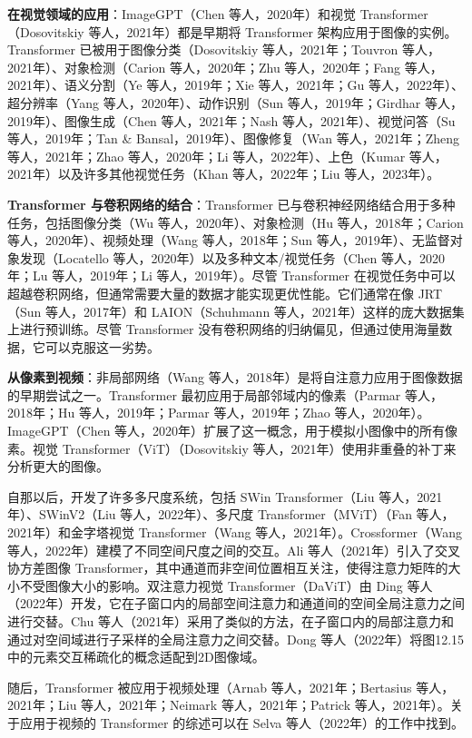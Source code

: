\textbf{在视觉领域的应用}：ImageGPT（Chen 等人，2020年）和视觉 Transformer（Dosovitskiy 等人，2021年）都是早期将 Transformer 架构应用于图像的实例。Transformer 已被用于图像分类（Dosovitskiy 等人，2021年；Touvron 等人，2021年）、对象检测（Carion 等人，2020年；Zhu 等人，2020年；Fang 等人，2021年）、语义分割（Ye 等人，2019年；Xie 等人，2021年；Gu 等人，2022年）、超分辨率（Yang 等人，2020年）、动作识别（Sun 等人，2019年；Girdhar 等人，2019年）、图像生成（Chen 等人，2021年；Nash 等人，2021年）、视觉问答（Su 等人，2019年；Tan \& Bansal，2019年）、图像修复（Wan 等人，2021年；Zheng 等人，2021年；Zhao 等人，2020年；Li 等人，2022年）、上色（Kumar 等人，2021年）以及许多其他视觉任务（Khan 等人，2022年；Liu 等人，2023年）。

\textbf{Transformer 与卷积网络的结合}：Transformer 已与卷积神经网络结合用于多种任务，包括图像分类（Wu 等人，2020年）、对象检测（Hu 等人，2018年；Carion 等人，2020年）、视频处理（Wang 等人，2018年；Sun 等人，2019年）、无监督对象发现（Locatello 等人，2020年）以及多种文本/视觉任务（Chen 等人，2020年；Lu 等人，2019年；Li 等人，2019年）。尽管 Transformer 在视觉任务中可以超越卷积网络，但通常需要大量的数据才能实现更优性能。它们通常在像 JRT（Sun 等人，2017年）和 LAION（Schuhmann 等人，2021年）这样的庞大数据集上进行预训练。尽管 Transformer 没有卷积网络的归纳偏见，但通过使用海量数据，它可以克服这一劣势。

\textbf{从像素到视频}：非局部网络（Wang 等人，2018年）是将自注意力应用于图像数据的早期尝试之一。Transformer 最初应用于局部邻域内的像素（Parmar 等人，2018年；Hu 等人，2019年；Parmar 等人，2019年；Zhao 等人，2020年）。ImageGPT（Chen 等人，2020年）扩展了这一概念，用于模拟小图像中的所有像素。视觉 Transformer（ViT）（Dosovitskiy 等人，2021年）使用非重叠的补丁来分析更大的图像。

自那以后，开发了许多多尺度系统，包括 SWin Transformer（Liu 等人，2021年）、SWinV2（Liu 等人，2022年）、多尺度 Transformer（MViT）（Fan 等人，2021年）和金字塔视觉 Transformer（Wang 等人，2021年）。Crossformer（Wang 等人，2022年）建模了不同空间尺度之间的交互。Ali 等人（2021年）引入了交叉协方差图像 Transformer，其中通道而非空间位置相互关注，使得注意力矩阵的大小不受图像大小的影响。双注意力视觉 Transformer（DaViT）由 Ding 等人（2022年）开发，它在子窗口内的局部空间注意力和通道间的空间全局注意力之间进行交替。Chu 等人（2021年）采用了类似的方法，在子窗口内的局部注意力和通过对空间域进行子采样的全局注意力之间交替。Dong 等人（2022年）将图12.15中的元素交互稀疏化的概念适配到2D图像域。

随后，Transformer 被应用于视频处理（Arnab 等人，2021年；Bertasius 等人，2021年；Liu 等人，2021年；Neimark 等人，2021年；Patrick 等人，2021年）。关于应用于视频的 Transformer 的综述可以在 Selva 等人（2022年）的工作中找到。

